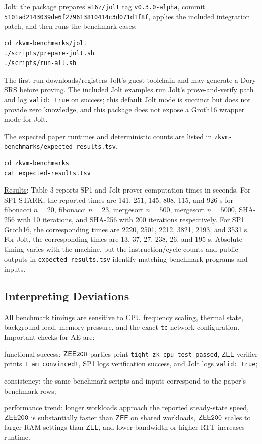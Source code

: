 \documentclass[nonacm,sigconf]{acmart}
\newcommand{\oursystem}{$\mathsf{ZEE}\tt{200}$\xspace}
\newcommand{\zee}[0]{\ensuremath{\mathsf{ZEE}}\xspace}
\newcommand{\passmsg}{\texttt{tight zk cpu test passed}}
\begin{document}
\noindent
\underline{Jolt}: the package prepares \texttt{a16z/jolt} tag
\texttt{v0.3.0-alpha}, commit
\texttt{5101ad2143039de6f279613810414c3d071d1f8f}, applies the included
integration patch, and then runs the benchmark cases:
\begin{verbatim}
cd zkvm-benchmarks/jolt
./scripts/prepare-jolt.sh
./scripts/run-all.sh
\end{verbatim}
The first run downloads/registers Jolt's guest toolchain and may
generate a Dory SRS before proving. The included Jolt examples run
Jolt's prove-and-verify path and log \texttt{valid: true} on success;
this default Jolt mode is succinct but does not provide zero knowledge,
and this package does not expose a Groth16 wrapper mode for Jolt.

The expected paper runtimes and deterministic counts are listed in
\texttt{zkvm-benchmarks/expected-results.tsv}.
\begin{verbatim}
cd zkvm-benchmarks
cat expected-results.tsv
\end{verbatim}

\noindent
\underline{Results}: Table 3 reports SP1 and Jolt prover computation
times in seconds. For SP1 STARK, the reported times are 141, 251, 145,
808, 115, and 926 s for fibonacci $n=20$, fibonacci $n=23$,
mergesort $n=500$, mergesort $n=5000$, SHA-256 with 10 iterations, and
SHA-256 with 200 iterations respectively. For SP1 Groth16, the
corresponding times are 2220, 2501, 2212, 3821, 2193, and 3531 s. For
Jolt, the corresponding times are 13, 37, 27, 238, 26, and 195 s.
Absolute timing varies with the machine, but the instruction/cycle
counts and public outputs in \texttt{expected-results.tsv} identify
matching benchmark programs and inputs.

\subsection{Interpreting Deviations}

All benchmark timings are sensitive to CPU frequency scaling, thermal
state, background load, memory pressure, and the exact \texttt{tc}
network configuration. Important checks for AE are:
\begin{compactitem}
\item functional success: \oursystem parties print \passmsg, \zee
verifier prints \texttt{I am convinced!}, SP1 logs verification success,
and Jolt logs \texttt{valid: true};
\item consistency: the same benchmark scripts and inputs correspond to
the paper's benchmark rows;
\item performance trend: longer workloads approach the reported
steady-state speed, \oursystem is substantially faster than \zee on
shared workloads, \oursystem scales to larger RAM settings than \zee,
and lower bandwidth or higher RTT increases runtime.
\end{compactitem}
\end{document}
